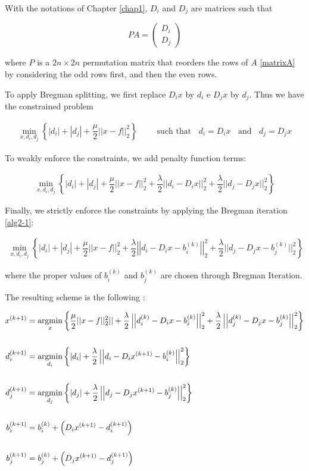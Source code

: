 With the notations of Chapter \ref{chap1}, $D_i$ and $D_j$ are matrices such that

$$PA = \begin{pmatrix} D_i \\
D_j \end{pmatrix}
$$

where $P$ is a $2n \times 2n$ permutation matrix that reorders the rows of $A$ \eqref{matrixA} by considering the odd rows first, and then the even rows.


To apply Bregman splitting, we first replace $D_i x$ by $d_i$ e $D_j x$ by $d_j$. Thus we have the constrained problem

\begin{align*}
\min_{x,d_i,d_j} \left\{ |d_i| + |d_j| + \dfrac{\mu}{2} ||x-f||_2^2\right\} \qquad \mbox{ such that } \; \; d_i = D_i x \; \; \mbox{ and } \; \; d_j = D_j x
\end{align*}

To weakly enforce the constraints, we add penalty function terms:

\begin{align*}
\min_{x,d_i,d_j} \left\{ |d_i| + |d_j| + \dfrac{\mu}{2} ||x-f||_2^2 + \dfrac{\lambda}{2} ||d_i - D_i x||_2^2 + \dfrac{\lambda}{2} ||d_j - D_j x||_2^2 \right\}
\end{align*}

Finally, we strictly enforce the constraints by applying the Bregman iteration \eqref{alg2-1}:

\begin{align*}
\min_{x,d_i,d_j} \left\{ |d_i| + |d_j| + \dfrac{\mu}{2} ||x-f||_2^2 + \dfrac{\lambda}{2} \left|\left|d_i - D_i x -b_i^{(k)}\right|\right|_2^2 + \dfrac{\lambda}{2} ||d_j - D_j x-b_j^{(k)}||_2^2 \right\}
\end{align*}

where the proper values of $b_i^{(k)}$ and $b_j^{(k)}$ are chosen through Bregman Iteration.

The resulting scheme is the following \citep{breg_l1}:

\begin{align*}
x^{(k+1)} &= \mathop{\mathrm{argmin}}\limits_x \left\{ \dfrac{\mu}{2} ||x-f||_2^2|| + \dfrac{\lambda}{2} \left|\left|d_i^{(k)} - D_i x - b_i^{(k)}\right|\right|_2^2 + \dfrac{\lambda}{2} \left|\left|d_j^{(k)} - D_j x -b_j^{(k)}\right|\right|_2^2 \right\} \\
\\
d_i^{(k+1)} &= \mathop{\mathrm{argmin}}\limits_{d_i} \left\{ |d_i| + \dfrac{\lambda}{2} \left|\left|d_i - D_i x^{(k+1)}-b_i^{(k)}\right|\right|_2^2 \right\} \\
\\
d_j^{(k+1)} &= \mathop{\mathrm{argmin}}\limits_{d_j} \left\{ |d_j| + \dfrac{\lambda}{2} \left|\left|d_j - D_j x^{(k+1)}-b_j^{(k)}\right|\right|_2^2 \right\} \\
\\
b_i^{(k+1)} &= b_i^{(k)} + \left(D_i x^{(k+1)} - d_i^{(k+1)} \right) \\
\\
b_j^{(k+1)} &= b_j^{(k)} + \left(D_j x^{(k+1)} - d_j^{(k+1)} \right)
\end{align*}

